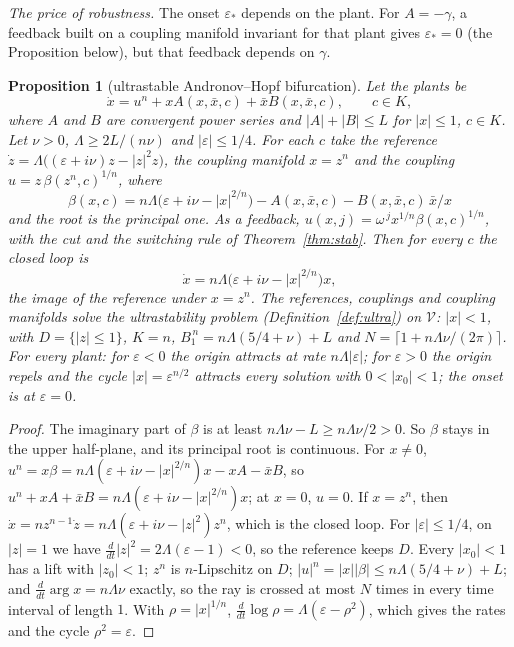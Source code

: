 \documentclass[11pt,reqno]{amsart}
\theoremstyle{plain}
\newtheorem*{proposition}{Proposition}
\theoremstyle{definition}
\theoremstyle{remark}
\begin{document}
\begin{enumerate}
\emph{The price of robustness.} The onset $\varepsilon_*$ depends on the plant. For $A=-\gamma$, a feedback built on a coupling manifold invariant for that plant gives $\varepsilon_*=0$ (the Proposition below), but that feedback depends on $\gamma$.

\begin{proposition}[ultrastable Andronov--Hopf bifurcation]\label{prop:hopf-ultra}
Let the plants be
\[
  \dot x=u^{n}+xA(x,\bar x,c)+\bar xB(x,\bar x,c),\qquad c\in K,
\]
where $A$ and $B$ are convergent power series and $|A|+|B|\le L$ for $|x|\le1$, $c\in K$. Let $\nu>0$, $\Lambda\ge2L/(n\nu)$ and $|\varepsilon|\le1/4$. For each $c$ take the reference $\dot z=\Lambda\bigl((\varepsilon+i\nu)z-|z|^{2}z\bigr)$, the coupling manifold $x=z^{n}$ and the coupling $u=z\,\beta(z^{n},c)^{1/n}$, where
\[
  \beta(x,c)=n\Lambda\bigl(\varepsilon+i\nu-|x|^{2/n}\bigr)-A(x,\bar x,c)-B(x,\bar x,c)\,\bar x/x
\]
and the root is the principal one. As a feedback, $u(x,j)=\omega^{\,j}x^{1/n}\beta(x,c)^{1/n}$, with the cut and the switching rule of Theorem~\ref{thm:stab}. Then for every $c$ the closed loop is
\[
  \dot x=n\Lambda\bigl(\varepsilon+i\nu-|x|^{2/n}\bigr)x,
\]
the image of the reference under $x=z^{n}$. The references, couplings and coupling manifolds solve the ultrastability problem (Definition~\ref{def:ultra}) on $\mathcal V$: $|x|<1$, with $D=\{|z|\le1\}$, $K=n$, $B_1^{\,n}=n\Lambda(5/4+\nu)+L$ and $N=\lceil1+n\Lambda\nu/(2\pi)\rceil$. For every plant: for $\varepsilon<0$ the origin attracts at rate $n\Lambda|\varepsilon|$; for $\varepsilon>0$ the origin repels and the cycle $|x|=\varepsilon^{n/2}$ attracts every solution with $0<|x_0|<1$; the onset is at $\varepsilon=0$.
\end{proposition}

\begin{proof}
The imaginary part of $\beta$ is at least $n\Lambda\nu-L\ge n\Lambda\nu/2>0$. So $\beta$ stays in the upper half-plane, and its principal root is continuous. For $x\ne0$, $u^{n}=x\beta=n\Lambda(\varepsilon+i\nu-|x|^{2/n})x-xA-\bar xB$, so $u^{n}+xA+\bar xB=n\Lambda(\varepsilon+i\nu-|x|^{2/n})x$; at $x=0$, $u=0$. If $x=z^{n}$, then $\dot x=nz^{n-1}\dot z=n\Lambda(\varepsilon+i\nu-|z|^{2})z^{n}$, which is the closed loop. For $|\varepsilon|\le1/4$, on $|z|=1$ we have $\frac{d}{dt}|z|^{2}=2\Lambda(\varepsilon-1)<0$, so the reference keeps $D$. Every $|x_0|<1$ has a lift with $|z_0|<1$; $z^{n}$ is $n$-Lipschitz on $D$; $|u|^{n}=|x||\beta|\le n\Lambda(5/4+\nu)+L$; and $\frac{d}{dt}\arg x=n\Lambda\nu$ exactly, so the ray is crossed at most $N$ times in every time interval of length $1$. With $\rho=|x|^{1/n}$, $\frac{d}{dt}\log\rho=\Lambda(\varepsilon-\rho^{2})$, which gives the rates and the cycle $\rho^{2}=\varepsilon$.
\end{proof}


\end{enumerate}
\end{document}
